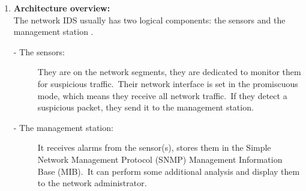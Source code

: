 \begin{enumerate}
					\begin{table}[h!]
						\centering
								\caption{TCP Flags} \label{flags}
						\end{table}				

						\item {\textbf{Architecture overview:}}\\
						
							The network IDS usually has two logical components: the sensors and the management station \cite{guide}.\\
							
							\begin{description}
								\item[- The sensors:] They are on the network segments, they are dedicated to monitor them for suspicious traffic.\ Their network interface is set in the promiscuous mode, which means they receive all network traffic.\ If they detect a suspicious packet, they send it to the management station.
								\item[- The management station:] It receives alarms from the sensor(s), stores them in the Simple Network Management Protocol (SNMP) Management Information Base (MIB).\ It can perform some additional analysis and display them to the network administrator.
							\end{description}


\end{enumerate}
